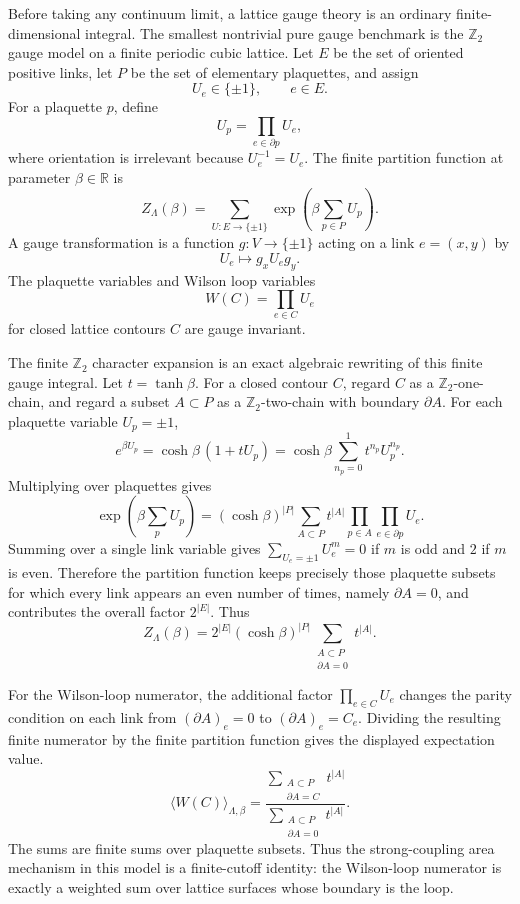 Before taking any continuum limit, a lattice gauge theory is an ordinary
finite-dimensional integral.  The smallest nontrivial pure gauge benchmark is
the \(\mathbb Z_2\) gauge model on a finite periodic cubic lattice.  Let
\(E\) be the set of oriented positive links, let \(P\) be the set of
elementary plaquettes, and assign
\[
  U_e\in\{\pm1\},\qquad e\in E .
\]
For a plaquette \(p\), define
\[
  U_p=\prod_{e\in\partial p}U_e ,
\]
where orientation is irrelevant because \(U_e^{-1}=U_e\).  The finite
partition function at parameter \(\beta\in\mathbb R\) is
\[
  Z_\Lambda(\beta)
  =
  \sum_{U:E\to\{\pm1\}}
  \exp\!\left(\beta\sum_{p\in P}U_p\right).
\]
A gauge transformation is a function \(g:V\to\{\pm1\}\) acting on a link
\(e=(x,y)\) by
\[
  U_e\longmapsto g_xU_eg_y .
\]
The plaquette variables and Wilson loop variables
\[
  W(C)=\prod_{e\in C}U_e
\]
for closed lattice contours \(C\) are gauge invariant.

The finite \(\mathbb Z_2\) character expansion is an exact algebraic
rewriting of this finite gauge integral.  Let \(t=\tanh\beta\).  For a closed
contour \(C\), regard \(C\) as a \(\mathbb Z_2\)-one-chain, and regard a
subset \(A\subset P\) as a \(\mathbb Z_2\)-two-chain with boundary
\(\partial A\).  For each plaquette variable \(U_p=\pm1\),
\[
  e^{\beta U_p}=\cosh\beta\,(1+tU_p)
  =
  \cosh\beta\sum_{n_p=0}^1 t^{n_p}U_p^{n_p}.
\]
Multiplying over plaquettes gives
\[
  \exp\!\left(\beta\sum_p U_p\right)
  =
  (\cosh\beta)^{|P|}
  \sum_{A\subset P}
  t^{|A|}
  \prod_{p\in A}\prod_{e\in\partial p}U_e .
\]
Summing over a single link variable gives
\(\sum_{U_e=\pm1}U_e^m=0\) if \(m\) is odd and \(2\) if \(m\) is even.
Therefore the partition function keeps precisely those plaquette subsets for
which every link appears an even number of times, namely
\(\partial A=0\), and contributes the overall factor \(2^{|E|}\).
Thus
\begin{equation}
  Z_\Lambda(\beta)
  =
  2^{|E|}(\cosh\beta)^{|P|}
  \sum_{\substack{A\subset P\\ \partial A=0}} t^{|A|}.
  \label{eq:z2-gauge-character-expansion-partition}
\end{equation}

For the Wilson-loop numerator, the additional factor
\(\prod_{e\in C}U_e\) changes the parity condition on each link from
\((\partial A)_e=0\) to \((\partial A)_e=C_e\).  Dividing the resulting
finite numerator by the finite partition function gives the displayed
expectation value.
\begin{equation}
  \langle W(C)\rangle_{\Lambda,\beta}
  =
  \frac{\displaystyle
  \sum_{\substack{A\subset P\\ \partial A=C}}t^{|A|}}
  {\displaystyle
  \sum_{\substack{A\subset P\\ \partial A=0}}t^{|A|}} .
  \label{eq:z2-gauge-character-expansion-wilson}
\end{equation}
The sums are finite sums over plaquette subsets.  Thus the strong-coupling
area mechanism in this model is a finite-cutoff identity: the Wilson-loop
numerator is exactly a weighted sum over lattice surfaces whose boundary is
the loop.

